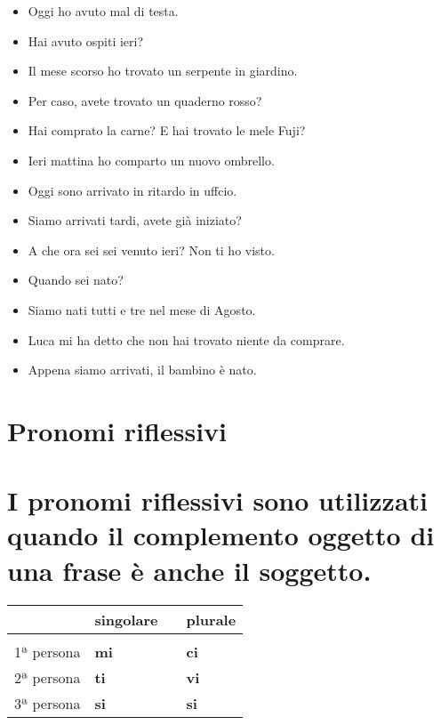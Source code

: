 \documentclass[letter,11pt]{article}
\begin{document}
\vskip 0.5in


\begin{multicols}{2}
\begin{itemize}
    \item Oggi ho avuto mal di testa.
    \item Hai avuto ospiti ieri?
    \item Il mese scorso ho trovato un serpente in giardino.
    \item Per caso, avete trovato un quaderno rosso?
    \item Hai comprato la carne? E hai trovato le mele Fuji?
    \item Ieri mattina ho comparto un nuovo ombrello.
    \item Oggi sono arrivato in ritardo in uffcio.
    \item Siamo arrivati tardi, avete già iniziato?
    \item A che ora sei sei venuto ieri? Non ti ho visto.
    \item Quando sei nato?
    \item Siamo nati tutti e tre nel mese di Agosto.
    \item Luca mi ha detto che non hai trovato niente da comprare.
    \item Appena siamo arrivati, il bambino è nato.

\end{itemize}
\end{multicols}

\vskip 0.2in

\section*{Pronomi riflessivi}
\section*{I pronomi riflessivi sono utilizzati quando il complemento oggetto di una frase è anche il soggetto.}
\vskip 0.2in

\begin{tabular}{ |p{3cm}| p{2cm}| p{0.2cm}| p{2cm}| }
      & singolare  &    &   plurale  \\
    \hline
    \hline
     &  &      &  \\ \hline
    1ª persona & {\bf mi}   &   &  {\bf ci}  \\ \hline
    2ª persona & {\bf ti}   &   &  {\bf vi}  \\ \hline
    3ª persona & {\bf si}   &   &  {\bf si}  \\ \hline
    \hline
\end{tabular}
\end{document}
